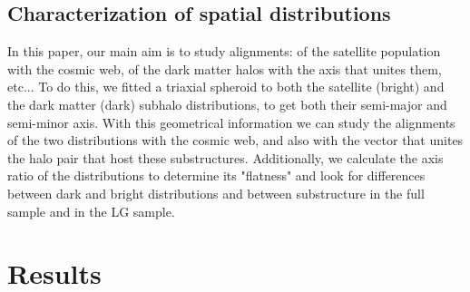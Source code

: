 \subsection{Characterization of spatial distributions}
\label{Method}
In this paper, our main aim is to study alignments: of the
satellite population with the cosmic web, of the dark matter halos
with the axis that unites them, etc...   
To do this, we fitted a triaxial spheroid to both the satellite
(bright) and the dark matter (dark) subhalo distributions, to get both
their semi-major and semi-minor axis.   
With this geometrical information we can study the alignments of the
two distributions with the cosmic web, and also with the vector that
unites the halo pair that host these substructures. 
Additionally, we calculate the axis ratio of the distributions to
determine its "flatness" and look for differences between dark and
bright distributions and between substructure in the full sample and
in the LG sample. 

\section{Results}
\label{Results}


